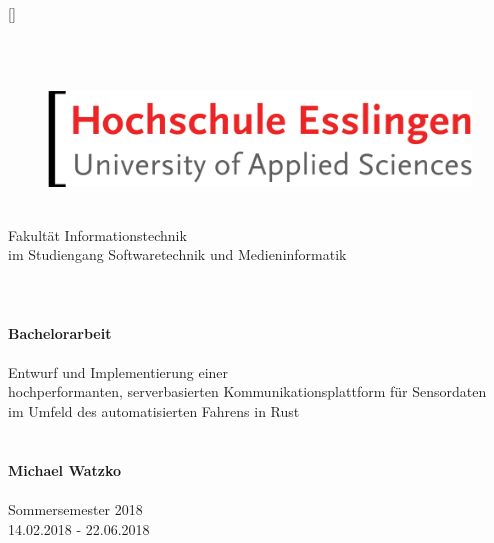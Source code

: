 

\newcommand{\setitle}{Bachelorarbeit}
\newcommand{\seauthor}{Michael Watzko}
\newcommand{\figurewidth}{0.66\textwidth}

\clearscrheadings
\clearscrplain

\pagestyle{scrheadings}	

\ihead[]{\leftmark}
\ohead[]{\rightmark}

\ifoot[]{}
\ofoot[\pagemark]{\pagemark}
\setheadsepline{.4pt}[\color{black}]

\begin{titlepage}
	\centering
	~\\ ~\\ 
	\begin{figure}[H]
		\centering
		\includegraphics[width=.5\textwidth]{images/hs_logo.png}
	\end{figure}
	~\\
	Fakultät Informationstechnik \\
	im Studiengang Softwaretechnik und Medieninformatik
	 ~\\ ~\\ ~\\ ~\\
	\LARGE{
		\textbf{\setitle} ~\\ ~\\
		Entwurf und Implementierung einer\\hochperformanten,
		serverbasierten Kommunikationsplattform für Sensordaten\\
		im Umfeld des automatisierten Fahrens in Rust
	}
	~\\ ~\\ ~\\
	\normalsize \textbf{Michael Watzko} \\ ~\\
	Sommersemester 2018 \\
	14.02.2018 - 22.06.2018
	 ~\\ ~\\ ~\\ ~\\ ~\\
	\begin{tabular}{rl}

\end{tabular}
\end{titlepage}
